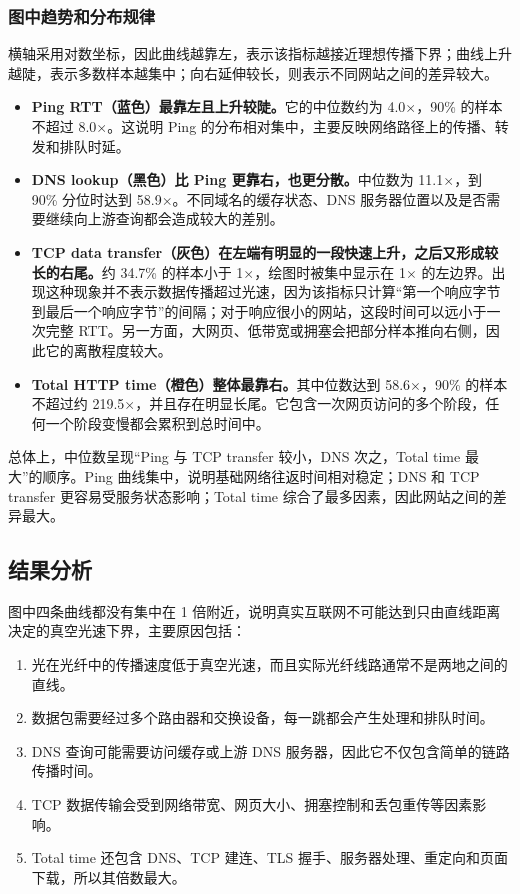 \documentclass[UTF8,12pt,a4paper,fontset=fandol]{ctexart}
\begin{document}
\subsubsection{图中趋势和分布规律}

横轴采用对数坐标，因此曲线越靠左，表示该指标越接近理想传播下界；曲线上升越陡，表示多数样本越集中；向右延伸较长，则表示不同网站之间的差异较大。

\begin{itemize}
  \item \textbf{Ping RTT（蓝色）最靠左且上升较陡。}它的中位数约为 4.0$\times$，90\% 的样本不超过 8.0$\times$。这说明 Ping 的分布相对集中，主要反映网络路径上的传播、转发和排队时延。
  \item \textbf{DNS lookup（黑色）比 Ping 更靠右，也更分散。}中位数为 11.1$\times$，到 90\% 分位时达到 58.9$\times$。不同域名的缓存状态、DNS 服务器位置以及是否需要继续向上游查询都会造成较大的差别。
  \item \textbf{TCP data transfer（灰色）在左端有明显的一段快速上升，之后又形成较长的右尾。}约 34.7\% 的样本小于 1$\times$，绘图时被集中显示在 1$\times$ 的左边界。出现这种现象并不表示数据传播超过光速，因为该指标只计算“第一个响应字节到最后一个响应字节”的间隔；对于响应很小的网站，这段时间可以远小于一次完整 RTT。另一方面，大网页、低带宽或拥塞会把部分样本推向右侧，因此它的离散程度较大。
  \item \textbf{Total HTTP time（橙色）整体最靠右。}其中位数达到 58.6$\times$，90\% 的样本不超过约 219.5$\times$，并且存在明显长尾。它包含一次网页访问的多个阶段，任何一个阶段变慢都会累积到总时间中。
\end{itemize}

总体上，中位数呈现“Ping 与 TCP transfer 较小，DNS 次之，Total time 最大”的顺序。Ping 曲线集中，说明基础网络往返时间相对稳定；DNS 和 TCP transfer 更容易受服务状态影响；Total time 综合了最多因素，因此网站之间的差异最大。

\subsection{结果分析}

图中四条曲线都没有集中在 1 倍附近，说明真实互联网不可能达到只由直线距离决定的真空光速下界，主要原因包括：

\begin{enumerate}
  \item 光在光纤中的传播速度低于真空光速，而且实际光纤线路通常不是两地之间的直线。
  \item 数据包需要经过多个路由器和交换设备，每一跳都会产生处理和排队时间。
  \item DNS 查询可能需要访问缓存或上游 DNS 服务器，因此它不仅包含简单的链路传播时间。
  \item TCP 数据传输会受到网络带宽、网页大小、拥塞控制和丢包重传等因素影响。
  \item Total time 还包含 DNS、TCP 建连、TLS 握手、服务器处理、重定向和页面下载，所以其倍数最大。
\end{enumerate}
\end{document}
